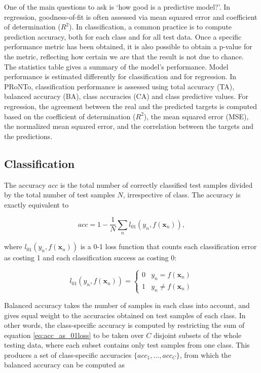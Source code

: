 One of the main questions to ask is `how good is a predictive model?'. In regression, goodness-of-fit is often assessed via mean squared error and coefficient of determination ($R^2$). In classification, a common practice is to compute prediction accuracy, both for each class and for all test data. Once a specific performance metric has been obtained, it is also possible to obtain a p-value for the metric, reflecting how certain we are that the result is not due to chance.
\\

The statistics table gives a summary of the model's performance. Model performance is estimated differently for classification and for regression. In PRoNTo, classification performance is assessed using total accuracy (TA), balanced accuracy (BA), class accuracies (CA) and class predictive values. For regression, the agreement between the real and the predicted targets is computed based on the coefficient of determination ($R^2$), the mean squared error (MSE), the normalized mean squared error, and the correlation between the targets and the predictions.

\subsection{Classification} 

The accuracy $acc$ is the total number of correctly classified test samples divided by the total number of test samples $N$, irrespective of class. The accuracy is exactly equivalent to 

\begin{equation}
\label{eq:acc_as_01loss}
acc = 1- \frac{1}{N} \sum_n l_{01}(y_n,f(\mathbf{x}_n)),
\end{equation}

where $l_{01}(y_n,f(\mathbf{x}_n))$ is a 0-1 loss function that 
counts each classification error as costing 1 and each classification success as costing 0:

\begin{equation}
l_{01}(y_n,f(\mathbf{x}_n)) = \left\{
\begin{array}{ll}
0 & y_n = f(\mathbf{x}_n)\\
1 & y_n \neq f(\mathbf{x}_n)
\end{array} \right.
\end{equation}


Balanced accuracy takes the number of samples in each class into account, and gives equal weight to the accuracies obtained on test samples of each class. In other words, the class-specific accuracy is computed by restricting  the sum of equation \ref{eq:acc_as_01loss} to be taken over $C$ disjoint subsets of the whole testing data, where each subset contains only test samples from one class. This produces a set of class-specific accuracies $\{acc_1, \ldots, acc_C\}$, from which the balanced accuracy can be computed as 

